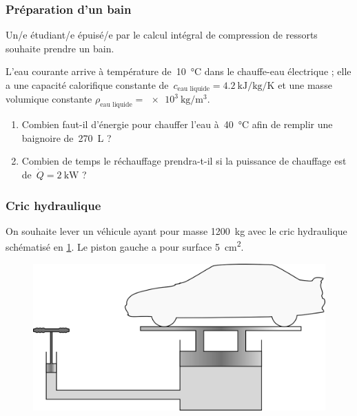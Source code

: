 \subsubsection{Préparation d’un bain}
\label{exo_bain}

	Un/e étudiant/e épuisé/e par le calcul intégral de compression de ressorts souhaite prendre un bain.
	
	L’eau courante arrive à température de~\SI{10}{\degreeCelsius} dans le chauffe-eau électrique ; elle a une capacité calorifique constante de~$c_{\text{eau liquide}} = \SI{4,2}{\kilo\joule\per\kilogram\per\kelvin}$ et une masse volumique constante $\rho_{\text{eau liquide}} = \SI{e3}{\kilogram\per\metre\cubed}$.
	
	\begin{enumerate}
		\item Combien faut-il d’énergie pour chauffer l’eau à~\SI{40}{\degreeCelsius} afin de remplir une baignoire de~\SI{270}{\liter} ?
		\item Combien de temps le réchauffage prendra-t-il si la puissance de chauffage est de~$\dot Q = \SI{+2}{\kilo\watt}$ ?
	\end{enumerate}



\subsubsection{Cric hydraulique}
\label{exo_cric}

	\wherefrom{[DS n°1 2012, 5pts]}

	On souhaite lever un véhicule ayant pour masse \SI{1200}{\kilogram} avec le cric hydraulique schématisé en \cref{fig_cric}. Le piston gauche a pour surface \SI{5}{\centi\metre\squared}.	

	\begin{figure}
		\begin{center}
			\includegraphics[width=12cm]{images/cric.png}
		\end{center}
		\label{fig_cric}
	\end{figure}

